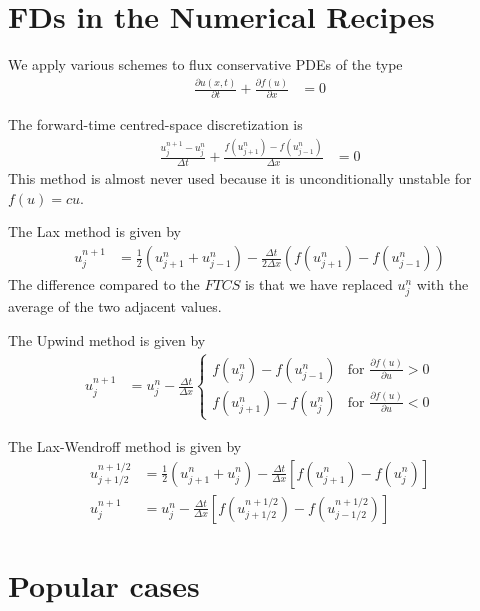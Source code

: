 \documentclass[twocolumn]{myarticle}
\begin{document}
\section{FDs in the Numerical Recipes}
\label{sec:fds_in_the_numerical_recipes}

We apply various schemes to flux conservative PDEs of the type
\begin{align}
    \frac{\partial u(x,t)}{\partial t} + \frac{\partial f(u)}{\partial x} &= 0
\end{align}

The forward-time centred-space discretization is
\begin{align}
    \frac{u^{n+1}_j - u^n_j}{\Delta t} + \frac{f\left(u^n_{j+1}\right) - f\left(u^n_{j-1}\right)}{\Delta x} &= 0
\end{align}
This method is almost never used because it is unconditionally unstable for $ f(u) = c u $.

The Lax method is given by
\begin{align}
    u^{n+1}_j  &= \frac{1}{2} \left( u^n_{j+1} + u^n_{j-1} \right) - \frac{\Delta t}{2 \Delta x} \left( f\left( u^n_{j+1} \right) - f\left( u^n_{j-1} \right) \right)
\end{align}
The difference compared to the $ FTCS $ is that we have replaced $ u^n_j $ with the average of the two adjacent values.

The Upwind method is given by
\begin{align}
u^{n+1}_j &= u^n_j - \frac{\Delta t}{\Delta x} \begin{cases} f(u^n_j) - f(u^n_{j-1}) & \text{for } \frac{\partial f(u)}{\partial u} > 0 \\ f(u^n_{j+1}) - f(u^n_j) & \text{for } \frac{\partial f(u)}{\partial u} < 0 \end{cases}
\end{align}

The Lax-Wendroff method is given by
\begin{align}
    u^{n+1/2}_{j+1/2} &= \frac{1}{2} \left( u^n_{j+1} + u^n_j \right) - \frac{\Delta t}{\Delta x} \left[ f \left( u^n_{j+1} \right) - f\left( u^n_j \right) \right]
    \\
    u^{n+1}_{j} &= u^n_j - \frac{\Delta t}{\Delta x} \left[ f \left( u^{n+1/2}_{j+1/2} \right) - f\left( u^{n+1/2}_{j-1/2} \right) \right]
\end{align}

\section{Popular cases}
\label{sec:popular_cases}
\end{document}
